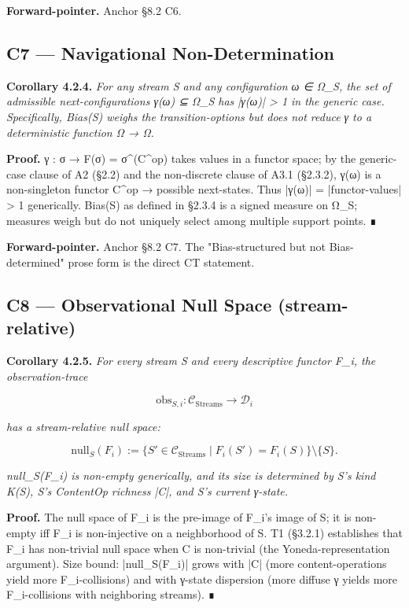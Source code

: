 \documentclass[11pt, openany]{book}
\begin{document}
\textbf{Forward-pointer.} Anchor §8.2 C6.

\subsection{C7 --- Navigational Non-Determination}

\textbf{Corollary 4.2.4.} \textit{For any stream S and any configuration ω ∈ Ω\_\allowbreak{}S, the set of admissible next-configurations γ(ω) ⊆ Ω\_\allowbreak{}S has |γ(ω)| > 1 in the generic case. Specifically, Bias(S) weighs the transition-options but does not reduce γ to a deterministic function Ω → Ω.}

\textbf{Proof.} γ : σ → F(σ) = σ\textasciicircum{}(C\textasciicircum{}op) takes values in a functor space; by the generic-case clause of A2 (§2.2) and the non-discrete clause of A3.1 (§2.3.2), γ(ω) is a non-singleton functor C\textasciicircum{}op → {possible next-states}. Thus |γ(ω)| = |functor-values| > 1 generically. Bias(S) as defined in §2.3.4 is a signed measure on Ω\_\allowbreak{}S; measures weigh but do not uniquely select among multiple support points. ∎

\textbf{Forward-pointer.} Anchor §8.2 C7. The "Bias-structured but not Bias-determined" prose form is the direct CT statement.

\subsection{C8 --- Observational Null Space (stream-relative)}

\textbf{Corollary 4.2.5.} \textit{For every stream S and every descriptive functor F\_\allowbreak{}i, the observation-trace}

\[
\mathrm{obs}_{S,i} : \mathcal{C}_\mathrm{Streams} \to \mathcal{D}_i
\]

\textit{has a stream-relative null space:}

\[
\mathrm{null}_S(F_i) := \{S' \in \mathcal{C}_\mathrm{Streams} \mid F_i(S') = F_i(S)\} \setminus \{S\}.
\]

\textit{null\_\allowbreak{}S(F\_\allowbreak{}i) is non-empty generically, and its size is determined by S's kind K(S), S's ContentOp richness |C|, and S's current γ-state.}

\textbf{Proof.} The null space of F\_\allowbreak{}i is the pre-image of F\_\allowbreak{}i's image of S; it is non-empty iff F\_\allowbreak{}i is non-injective on a neighborhood of S. T1 (§3.2.1) establishes that F\_\allowbreak{}i has non-trivial null space when C is non-trivial (the Yoneda-representation argument). Size bound: |null\_\allowbreak{}S(F\_\allowbreak{}i)| grows with |C| (more content-operations yield more F\_\allowbreak{}i-collisions) and with γ-state dispersion (more diffuse γ yields more F\_\allowbreak{}i-collisions with neighboring streams). ∎
\end{document}
